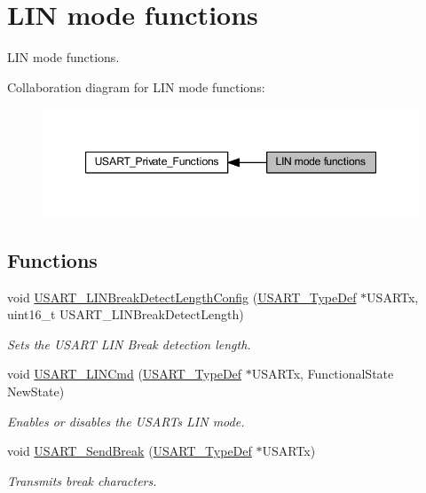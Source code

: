 \hypertarget{group___u_s_a_r_t___group4}{}\section{L\+IN mode functions}
\label{group___u_s_a_r_t___group4}


L\+IN mode functions.  


Collaboration diagram for L\+IN mode functions\+:
\nopagebreak
\begin{figure}[H]
\begin{center}
\leavevmode
\includegraphics[width=347pt]{group___u_s_a_r_t___group4}
\end{center}
\end{figure}
\subsection*{Functions}
\begin{DoxyCompactItemize}
\item 
void \hyperlink{group___u_s_a_r_t___group4_ga7bc2d291831cbc5e53e73337308029b5}{U\+S\+A\+R\+T\+\_\+\+L\+I\+N\+Break\+Detect\+Length\+Config} (\hyperlink{struct_u_s_a_r_t___type_def}{U\+S\+A\+R\+T\+\_\+\+Type\+Def} $\ast$U\+S\+A\+R\+Tx, uint16\+\_\+t U\+S\+A\+R\+T\+\_\+\+L\+I\+N\+Break\+Detect\+Length)
\begin{DoxyCompactList}\small\item\em Sets the U\+S\+A\+RT L\+IN Break detection length. \end{DoxyCompactList}\item 
void \hyperlink{group___u_s_a_r_t___group4_ga9fdd6296f4ca4acdfcbd58bf56bd4185}{U\+S\+A\+R\+T\+\_\+\+L\+I\+N\+Cmd} (\hyperlink{struct_u_s_a_r_t___type_def}{U\+S\+A\+R\+T\+\_\+\+Type\+Def} $\ast$U\+S\+A\+R\+Tx, Functional\+State New\+State)
\begin{DoxyCompactList}\small\item\em Enables or disables the U\+S\+A\+RT\textquotesingle{}s L\+IN mode. \end{DoxyCompactList}\item 
void \hyperlink{group___u_s_a_r_t___group4_ga39a3d33e23ee28529fa8f7259ce6811e}{U\+S\+A\+R\+T\+\_\+\+Send\+Break} (\hyperlink{struct_u_s_a_r_t___type_def}{U\+S\+A\+R\+T\+\_\+\+Type\+Def} $\ast$U\+S\+A\+R\+Tx)
\begin{DoxyCompactList}\small\item\em Transmits break characters. \end{DoxyCompactList}\end{DoxyCompactItemize}


